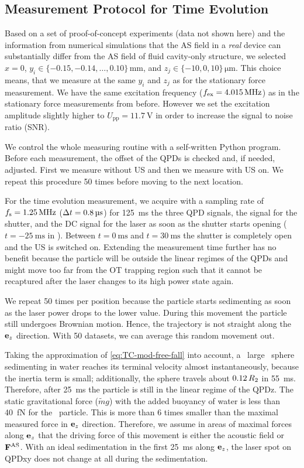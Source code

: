 \subsection{Measurement Protocol for Time Evolution}

Based on a set of proof-of-concept experiments (data not shown here) and the 
information from numerical simulations that the AS field in a \emph{real} 
device can substantially differ from the AS field of fluid cavity-only 
structure, we selected $x = 0$, $y_{i} \in 
\{-0.15,-0.14,\dots,0.10\}\,\si{\mm}$, and $z_{j} \in \{-10,0,10\}\,\si{\um}$. 
This choice means, that we measure at the same $y_{i}$ and $z_{j}$ as for the 
stationary force measurement. We have the same excitation frequency ($\fex = 
\SI{4.015}{\MHz}$) as in the stationary force measurements from before. However 
we set the excitation amplitude slightly higher to $U_{\text{pp}} = 
\SI{11.7}{\volt}$ in order to increase the signal to noise ratio (SNR).

We control the whole measuring routine with a self-written Python program. 
Before each measurement, the offset of the QPDs is checked and, if needed, 
adjusted. First we measure without US and then we measure with US on. We repeat 
this procedure 50 times before moving to the next location.

For the time evolution measurement, we acquire with a sampling rate of $\fs 
=\SI{1.25}{\MHz}$ ($\Dt = \SI{0.8}{\us}$) for \SI{125}{\ms} the three QPD 
signals, the signal for the shutter, and the DC signal for the laser as soon as 
the shutter starts opening ($t = \SI{-25}{\ms}$ in ). 
Between $t =\SI{0}{\ms}$ and $t = \SI{30}{\ms}$ the shutter is completely open 
and the US is switched on. Extending the measurement time further has no 
benefit because the particle will be outside the linear regimes of the QPDs and 
might move too far from the OT trapping region such that it cannot be 
recaptured after the laser changes to its high power state again.

We repeat 50 times per position because the particle starts sedimenting 
as soon as the laser power drops to the lower value. During this movement the 
particle still undergoes Brownian motion. Hence, the trajectory is not straight 
along the $\vb{e}_{z}$ direction. With 50 datasets, we can average this random 
movement out.

Taking the approximation of \cref{eq:TC-mod-free-fall} into account, a \Dtwo~large 
\SiO~sphere sedimenting in water reaches its terminal velocity 
almost instantaneously, because the inertia term is small; additionally, the 
sphere travels about $0.12\,R_{2}$ in \SI{55}{\ms}. Therefore, after 
\SI{25}{\ms} the particle is still in the linear regime of the QPDz. The static 
gravitational force ($\tilde{m}g$) with the added buoyancy of water is less 
than \SI{40}{\femto\newton} for the \Dtwo~particle. This is more than 6 times 
smaller than the maximal measured force in $\vb{e}_{z}$ direction. Therefore, we 
assume in areas of maximal forces along $\vb{e}_{z}$ that the driving force of this 
movement is either the acoustic field or $\vb{F}^{\mathrm{AS}}$. With an ideal sedimentation in 
the first \SI{25}{\ms} along $\vb{e}_{z}$, the laser spot on QPDxy does not change at 
all during the sedimentation.

